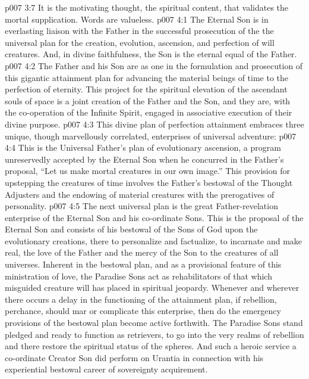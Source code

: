 \vs p007 3:7 It is the motivating thought, the spiritual content, that validates the mortal supplication. Words are valueless.
\vs p007 4:1 The Eternal Son is in everlasting liaison with the Father in the successful prosecution of the  the universal plan for the creation, evolution, ascension, and perfection of will creatures. And, in divine faithfulness, the Son is the eternal equal of the Father.
\vs p007 4:2 The Father and his Son are as one in the formulation and prosecution of this gigantic attainment plan for advancing the material beings of time to the perfection of eternity. This project for the spiritual elevation of the ascendant souls of space is a joint creation of the Father and the Son, and they are, with the co\hyp{}operation of the Infinite Spirit, engaged in associative execution of their divine purpose.
\vs p007 4:3 \pc This divine plan of perfection attainment embraces three unique, though marvellously correlated, enterprises of universal adventure:
\vs p007 4:4 \bibnobreakspace {} This is the Universal Father’s plan of evolutionary ascension, a program unreservedly accepted by the Eternal Son when he concurred in the Father’s proposal, “Let us make mortal creatures in our own image.” This provision for upstepping the creatures of time involves the Father’s bestowal of the Thought Adjusters and the endowing of material creatures with the prerogatives of personality.
\vs p007 4:5 \bibnobreakspace {} The next universal plan is the great Father\hyp{}revelation enterprise of the Eternal Son and his co\hyp{}ordinate Sons. This is the proposal of the Eternal Son and consists of his bestowal of the Sons of God upon the evolutionary creations, there to personalize and factualize, to incarnate and make real, the love of the Father and the mercy of the Son to the creatures of all universes. Inherent in the bestowal plan, and as a provisional feature of this ministration of love, the Paradise Sons act as rehabilitators of that which misguided creature will has placed in spiritual jeopardy. Whenever and wherever there occurs a delay in the functioning of the attainment plan, if rebellion, perchance, should mar or complicate this enterprise, then do the emergency provisions of the bestowal plan become active forthwith. The Paradise Sons stand pledged and ready to function as retrievers, to go into the very realms of rebellion and there restore the spiritual status of the spheres. And such a heroic service a co\hyp{}ordinate Creator Son did perform on Urantia in connection with his experiential bestowal career of sovereignty acquirement.
